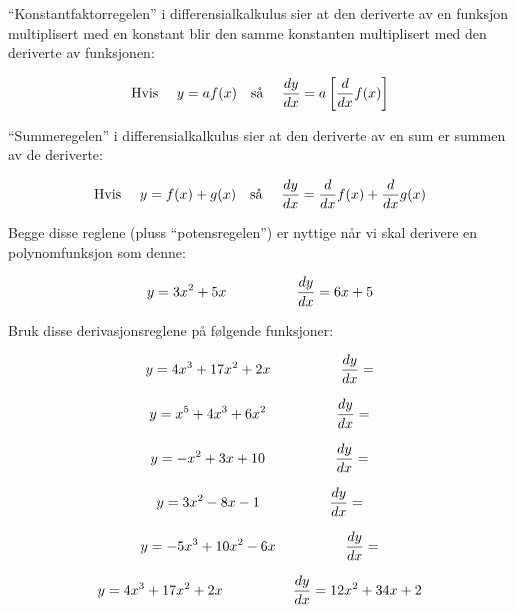 

``Konstantfaktorregelen'' i differensialkalkulus sier at den deriverte av en funksjon multiplisert med en konstant blir den samme konstanten multiplisert med den deriverte av funksjonen:

$$\hbox{Hvis \hskip 10pt} y = a f(x) \hbox{\hskip 10pt så \hskip 10pt} {dy \over dx} = a \left[ {d \over dx} f(x) \right]$$

\vskip 10pt

``Summeregelen'' i differensialkalkulus sier at den deriverte av en sum er summen av de deriverte:

$$\hbox{Hvis \hskip 10pt} y = f(x) + g(x) \hbox{\hskip 10pt så \hskip 10pt} {dy \over dx} = {d \over dx} f(x) + {d \over dx} g(x)$$

\vskip 10pt

Begge disse reglene (pluss ``potensregelen'') er nyttige når vi skal derivere en polynomfunksjon som denne:

$$y = 3x^2 + 5x  \hbox{\hskip 50pt} {dy \over dx} = 6x + 5$$

\vskip 10pt

Bruk disse derivasjonsreglene på følgende funksjoner:

\vskip 20pt

$$y = 4x^3 + 17x^2 + 2x \hbox{\hskip 50pt} {dy \over dx} = $$

\vskip 20pt

$$y = x^5 + 4x^3 + 6x^2 \hbox{\hskip 50pt} {dy \over dx} = $$

\vskip 20pt

$$y = -x^2 + 3x + 10 \hbox{\hskip 50pt} {dy \over dx} = $$

\vskip 20pt

$$y = 3x^2 - 8x - 1 \hbox{\hskip 50pt} {dy \over dx} = $$

\vskip 20pt

$$y = -5x^3 + 10x^2 - 6x \hbox{\hskip 50pt} {dy \over dx} = $$







$$y = 4x^3 + 17x^2 + 2x \hbox{\hskip 50pt} {dy \over dx} = 12x^2 + 34x + 2$$

\vskip 20pt

